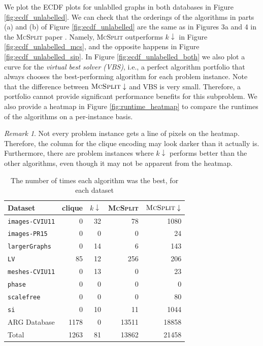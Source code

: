 \documentclass{l4proj}
\theoremstyle{definition}
\theoremstyle{remark}
\newtheorem{remark}{Remark}[section]
\begin{document}
We plot the ECDF plots for unlablled graphs in both databases in Figure
\ref{fig:ecdf_unlabelled}. We can check that the orderings of the algorithms in
parts (a) and (b) of Figure \ref{fig:ecdf_unlabelled} are the same as in Figures
3a and 4 in the \textsc{McSplit} paper \cite{DBLP:conf/ijcai/McCreeshPT17}.
Namely, \textsc{McSplit} outperforms $k\downarrow$ in Figure
\ref{fig:ecdf_unlabelled_mcs}, and the opposite happens in Figure
\ref{fig:ecdf_unlabelled_sip}. In Figure \ref{fig:ecdf_unlabelled_both} we also
plot a curve for the \emph{virtual best solver (VBS)}, i.e., a perfect algorithm
portfolio that always chooses the best-performing algorithm for each problem
instance. Note that the difference between $\textsc{McSplit}\downarrow$ and VBS
is very small. Therefore, a portfolio cannot provide significant performance
benefits for this subproblem. We also provide a heatmap in Figure
\ref{fig:runtime_heatmap} to compare the runtimes of the algorithms on a
per-instance basis.

\begin{remark}
  Not every problem instance gets a line of pixels on the heatmap. Therefore,
  the column for the clique encoding may look darker than it actually is.
  Furthermore, there are problem instances where $k\downarrow$ performs better
  than the other algorithms, even though it may not be apparent from the heatmap.
\end{remark}

\begin{table} %
  \centering
  \begin{tabular}{l r r r r}
    Dataset & clique & $k\downarrow$ & \textsc{McSplit} & $\textsc{McSplit}\downarrow$ \\
    \hline
    \texttt{images-CVIU11} & 0 & 32 & 78 & 1080 \\
    \texttt{images-PR15} & 0 & 0 & 0 & 24 \\
    \texttt{largerGraphs} & 0 & 14 & 6 & 143 \\
    \texttt{LV} & 85 & 12 & 256 & 206 \\
    \texttt{meshes-CVIU11} & 0 & 13 & 0 & 23 \\
    \texttt{phase} & 0 & 0 & 0 & 0 \\
    \texttt{scalefree} & 0 & 0 & 0 & 80 \\
    \texttt{si} & 0 & 10 & 11 & 1044 \\
    ARG Database & 1178 & 0 & 13511 & 18858 \\
    \hline
    Total & 1263 & 81 & 13862 & 21458
  \end{tabular}
  \caption{The number of times each algorithm was the best, for each dataset}
  \label{table:best}
\end{table}
\end{document}
